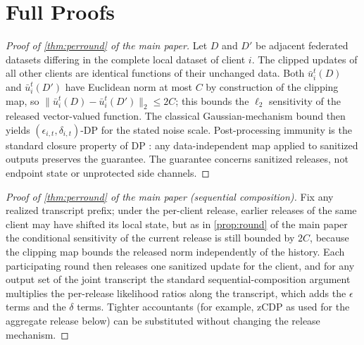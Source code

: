 \documentclass[a4paper,fleqn]{cas-dc}
\begin{document}
\section{Full Proofs}
\label{app:proofs}
\begin{proof}[Proof of \cref{thm:perround} of the main paper]
Let $D$ and $D'$ be adjacent federated datasets differing in the complete
local dataset of client $i$. The clipped updates of all other clients are
identical functions of their unchanged data. Both $\bar u_i^t(D)$ and
$\bar u_i^t(D')$ have Euclidean norm at most $C$ by construction of the
clipping map, so $\|\bar u_i^t(D)-\bar u_i^t(D')\|_2\le 2C$; this bounds the
$\ell_2$ sensitivity of the released vector-valued function. The classical
Gaussian-mechanism bound \cite{dwork2014algorithmic} then yields
$(\epsilon_{i,t},\delta_{i,t})$-DP for the stated noise scale.
Post-processing immunity is the standard closure property of DP
\cite{dwork2014algorithmic}: any data-independent map applied to sanitized
outputs preserves the guarantee. The guarantee concerns sanitized releases,
not endpoint state or unprotected side channels.
\end{proof}
\begin{proof}[Proof of \cref{thm:perround} of the main paper (sequential composition)]
Fix any realized transcript prefix; under the per-client release, earlier
releases of the same client may have shifted its local state, but as in
\cref{prop:round} of the main paper the conditional sensitivity of the current
release is still bounded by $2C$, because the clipping map bounds the
released norm independently of the history. Each participating round then
releases one sanitized update for the client, and for any output set of the
joint transcript the standard sequential-composition argument
\cite{dwork2014algorithmic,abadi2016deep} multiplies the per-release
likelihood ratios along the transcript, which adds the $\epsilon$ terms and
the $\delta$ terms. Tighter accountants (for example, zCDP as used for the
aggregate release below) can be substituted without changing the release
mechanism.
\end{proof}
\end{document}
